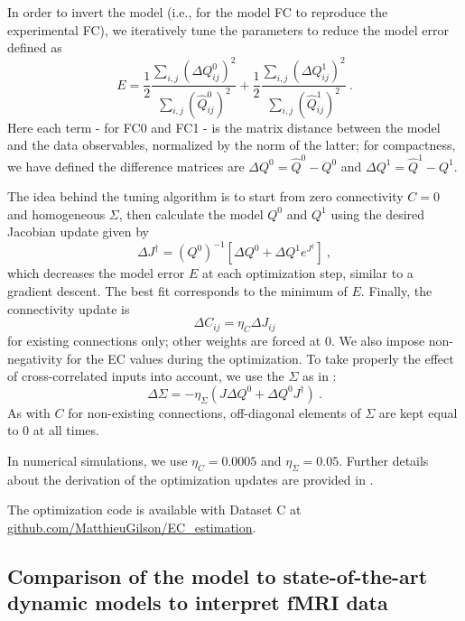 \documentclass{article}
\newcommand{\transp}{\dag}
\begin{document}
In order to invert the model (i.e., for the model FC to reproduce the experimental FC), we iteratively tune the parameters to reduce the model error defined as 
\begin{equation} \label{eq_error_mod}
E = \frac{1}{2} \frac{\sum_{i,j} (\Delta Q^0_{ij})^2}{\sum_{i,j} (\hat{Q}^0_{ij})^2} + \frac{1}{2} \frac{\sum_{i,j} (\Delta Q^1_{ij})^2}{\sum_{i,j} (\hat{Q}^1_{ij})^2} \ .
\end{equation}
Here each term - for FC0 and FC1 - is the matrix distance between the model and the data observables, normalized by the norm of the latter; for compactness, we have defined the difference matrices are $\Delta Q^0 = \widehat{Q}^0 - Q^0$ and $\Delta Q^1 = \widehat{Q}^1 - Q^1$.

The idea behind the tuning algorithm is to start from zero connectivity $C = 0$ and homogeneous $\Sigma$, then calculate the model $Q^0$ and $Q^1$ using the desired Jacobian update given by
\begin{equation}
\Delta J^\transp = (Q^0)^{-1} [\Delta Q^0 + \Delta Q^1 e^{J^\transp}]
\ ,
\end{equation}
which decreases the model error $E$ at each optimization step, similar to a gradient descent. The best fit corresponds to the minimum of $E$. Finally, the connectivity update is
\begin{equation}
\Delta C_{ij} = \eta_C \Delta J_{ij}
\end{equation}
for existing connections only; other weights are forced at 0. We also impose non-negativity for the EC values during the optimization. 
To take properly the effect of cross-correlated inputs into account, we use the $\Sigma$ as in \cite{Gilson_NeIm_2017}:
\begin{equation}
\Delta \Sigma = - \eta_\Sigma (J \Delta Q^0 + \Delta Q^0 J^\transp)
\ .
\end{equation}
As with $C$ for non-existing connections, off-diagonal elements of $\Sigma$ are kept equal to 0 at all times.

In numerical simulations, we use $\eta_C = 0.0005$ and $\eta_\Sigma = 0.05$. Further details about the derivation of the optimization updates are provided in \cite{Gilson_PCB_2016}.

The optimization code is available with Dataset C at \url{github.com/MatthieuGilson/EC_estimation}. 

\subsection{Comparison of the model to state-of-the-art dynamic models to interpret fMRI data}
\end{document}
